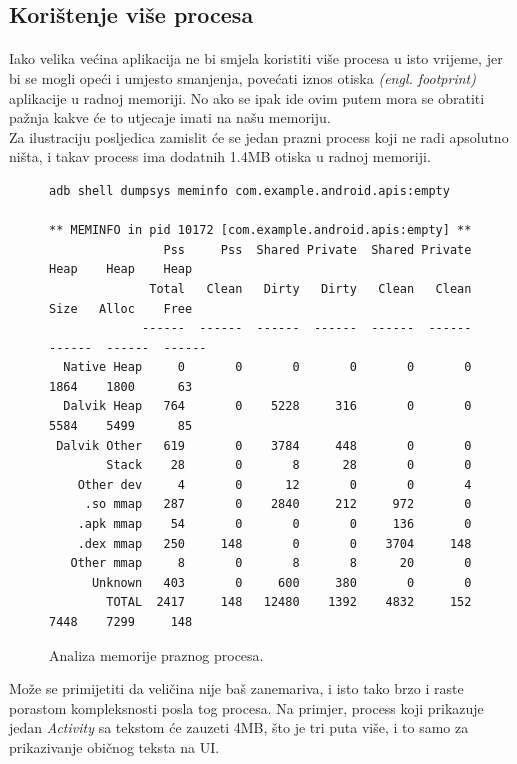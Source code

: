 \documentclass[times, utf8, zavrsni]{fer}
\begin{document}
\subsection{Korištenje više procesa}
\paragraph{}
Iako velika većina aplikacija ne bi smjela koristiti više procesa u isto vrijeme, jer bi se mogli opeći i umjesto smanjenja, povećati iznos otiska \textit{(engl. footprint)} aplikacije u radnoj memoriji. No ako se ipak ide ovim putem mora se obratiti pažnja kakve će to utjecaje imati na našu memoriju.\\

Za ilustraciju posljedica zamislit će se jedan prazni process koji ne radi apsolutno ništa, i takav process ima dodatnih 1.4MB otiska u radnoj memoriji.

\begin{figure}[ht!]
\centering
\begingroup
    \fontsize{8pt}{12pt}\selectfont
		\begin{verbatim}
adb shell dumpsys meminfo com.example.android.apis:empty

** MEMINFO in pid 10172 [com.example.android.apis:empty] **
                Pss     Pss  Shared Private  Shared Private    Heap    Heap    Heap
              Total   Clean   Dirty   Dirty   Clean   Clean    Size   Alloc    Free
             ------  ------  ------  ------  ------  ------  ------  ------  ------
  Native Heap     0       0       0       0       0       0    1864    1800      63
  Dalvik Heap   764       0    5228     316       0       0    5584    5499      85
 Dalvik Other   619       0    3784     448       0       0
        Stack    28       0       8      28       0       0
    Other dev     4       0      12       0       0       4
     .so mmap   287       0    2840     212     972       0
    .apk mmap    54       0       0       0     136       0
    .dex mmap   250     148       0       0    3704     148
   Other mmap     8       0       8       8      20       0
      Unknown   403       0     600     380       0       0
        TOTAL  2417     148   12480    1392    4832     152    7448    7299     148
		\end{verbatim}
\endgroup
\caption{Analiza memorije praznog procesa.}
\label{overflow}
\end{figure}

Može se primijetiti da veličina nije baš zanemariva, i isto tako brzo i raste porastom kompleksnosti posla tog procesa. Na primjer, process koji prikazuje jedan \textit{Activity} sa tekstom će zauzeti 4MB, što je tri puta više, i to samo za prikazivanje običnog teksta na UI.\\
\end{document}

